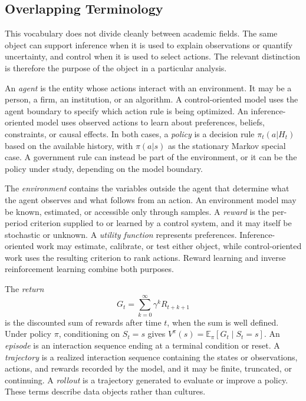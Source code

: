 \subsection{Overlapping Terminology}
\label{subsec:overlapping_terminology}

This vocabulary does not divide cleanly between academic fields. The same object can support inference when it is used to explain observations or quantify uncertainty, and control when it is used to select actions. The relevant distinction is therefore the purpose of the object in a particular analysis.

An \emph{agent} is the entity whose actions interact with an environment. It may be a person, a firm, an institution, or an algorithm. A control-oriented model uses the agent boundary to specify which action rule is being optimized. An inference-oriented model uses observed actions to learn about preferences, beliefs, constraints, or causal effects. In both cases, a \emph{policy} is a decision rule $\pi_t(a|H_t)$ based on the available history, with $\pi(a|s)$ as the stationary Markov special case. A government rule can instead be part of the environment, or it can be the policy under study, depending on the model boundary.

The \emph{environment} contains the variables outside the agent that determine what the agent observes and what follows from an action. An environment model may be known, estimated, or accessible only through samples. A \emph{reward} is the per-period criterion supplied to or learned by a control system, and it may itself be stochastic or unknown. A \emph{utility function} represents preferences. Inference-oriented work may estimate, calibrate, or test either object, while control-oriented work uses the resulting criterion to rank actions. Reward learning and inverse reinforcement learning combine both purposes.

The \emph{return}
\[
G_t=\sum_{k=0}^{\infty}\gamma^k R_{t+k+1}
\]
is the discounted sum of rewards after time $t$, when the sum is well defined. Under policy $\pi$, conditioning on $S_t=s$ gives $V^\pi(s)=\mathbb{E}_\pi[G_t\mid S_t=s]$. An \emph{episode} is an interaction sequence ending at a terminal condition or reset. A \emph{trajectory} is a realized interaction sequence containing the states or observations, actions, and rewards recorded by the model, and it may be finite, truncated, or continuing. A \emph{rollout} is a trajectory generated to evaluate or improve a policy. These terms describe data objects rather than cultures.

